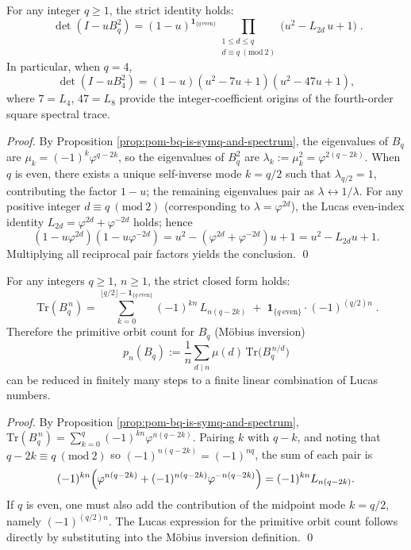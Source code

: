 \begin{theorem}\label{thm:pom-bq-lucas-square-spectrum-factorization}
For any integer \(q\ge 1\), the strict identity holds:
\[
\boxed{\;
\det(I-uB_q^2)
=(1-u)^{\mathbf 1_{\{q\ \mathrm{even}\}}}
\prod_{\substack{1\le d\le q\\ d\equiv q\ (\mathrm{mod}\ 2)}}
\bigl(u^2-L_{2d}\,u+1\bigr)\; } .
\]
In particular, when \(q=4\),
\[
\det(I-uB_4^2)=(1-u)(u^2-7u+1)(u^2-47u+1),
\]
where \(7=L_4\), \(47=L_8\) provide the integer-coefficient origins of the fourth-order square spectral trace.
\end{theorem}
\begin{proof}
By Proposition \ref{prop:pom-bq-is-symq-and-spectrum}, the eigenvalues of \(B_q\) are \(\mu_k=(-1)^k\varphi^{q-2k}\), so the eigenvalues of \(B_q^2\) are \(\lambda_k:=\mu_k^2=\varphi^{2(q-2k)}\).
When \(q\) is even, there exists a unique self-inverse mode \(k=q/2\) such that \(\lambda_{q/2}=1\), contributing the factor \(1-u\); the remaining eigenvalues pair as \(\lambda\leftrightarrow 1/\lambda\).
For any positive integer \(d\equiv q\ (\mathrm{mod}\ 2)\) (corresponding to \(\lambda=\varphi^{2d}\)), the Lucas even-index identity
\(
L_{2d}=\varphi^{2d}+\varphi^{-2d}
\)
holds; hence
\[
(1-u\varphi^{2d})(1-u\varphi^{-2d})=u^2-(\varphi^{2d}+\varphi^{-2d})u+1=u^2-L_{2d}u+1.
\]
Multiplying all reciprocal pair factors yields the conclusion. \qed
\end{proof}

\begin{theorem}\label{thm:pom-bq-trace-lucas}
For any integers \(q\ge 1\), \(n\ge 1\), the strict closed form holds:
\[
\boxed{\;
\mathrm{Tr}(B_q^{\,n})
=
\sum_{k=0}^{\lfloor q/2\rfloor-\mathbf 1_{\{q\ \mathrm{even}\}}}
(-1)^{kn}\,L_{n(q-2k)}
\;+\;
\mathbf 1_{\{q\ \mathrm{even}\}}\cdot (-1)^{(q/2)n}\; } .
\]
Therefore the primitive orbit count for \(B_q\) (Möbius inversion)
\[
p_n(B_q):=\frac{1}{n}\sum_{d\mid n}\mu(d)\,\mathrm{Tr}\!\bigl(B_q^{\,n/d}\bigr)
\]
can be reduced in finitely many steps to a finite linear combination of Lucas numbers.
\end{theorem}
\begin{proof}
By Proposition \ref{prop:pom-bq-is-symq-and-spectrum},
\(
\mathrm{Tr}(B_q^{\,n})=\sum_{k=0}^{q}(-1)^{kn}\varphi^{n(q-2k)}
\).
Pairing \(k\) with \(q-k\), and noting that \(q-2k\equiv q\ (\mathrm{mod}\ 2)\) so \((-1)^{n(q-2k)}=(-1)^{nq}\), the sum of each pair is
\[
(-1)^{kn}\Bigl(\varphi^{n(q-2k)}+(-1)^{n(q-2k)}\varphi^{-n(q-2k)}\Bigr)=(-1)^{kn}L_{n(q-2k)}.
\]
If \(q\) is even, one must also add the contribution of the midpoint mode \(k=q/2\), namely \((-1)^{(q/2)n}\).
The Lucas expression for the primitive orbit count follows directly by substituting into the M\"obius inversion definition. \qed
\end{proof}

